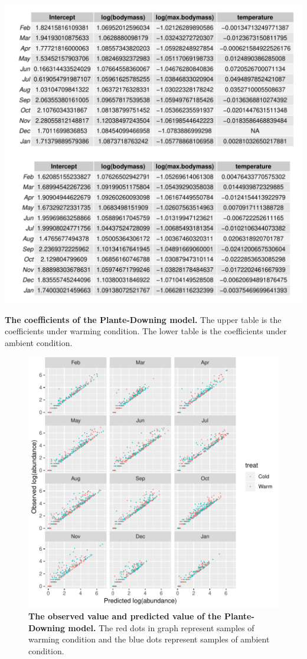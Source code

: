 \documentclass[11pt]{article}
\begin{document}
\begin{linenumbers}
\begin{table}[H]
  \centering
  \includegraphics[scale = 0.7]{../Graph/pdcoef.pdf}
  \caption{\textbf{The coefficients of the Plante-Downing model.}
   The upper table  is the coefficients under warming condition. The lower table is the coefficients under ambient condition. }
\end{table}

\begin{figure}[H]
  \centering
  \includegraphics[scale= 1.2]{../Graph/pd12l.pdf}
  \caption{\textbf{The observed value and predicted value of
  the Plante-Downing model.}
  The red dots in graph represent samples of warming condition and the blue dots represent samples of ambient condition. }
\end{figure}



\end{linenumbers}
\end{document}
